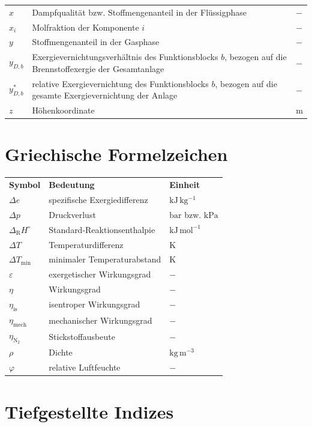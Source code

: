 \begin{longtable}{p{3cm}p{8cm}p{3cm}}
$x$ & Dampfqualität bzw. Stoffmengenanteil in der Flüssigphase & $-$ \\
$x_i$ & Molfraktion der Komponente $i$ & $-$ \\
$y$ & Stoffmengenanteil in der Gasphase & $-$ \\
$y_{D,b}$ & Exergievernichtungsverhältnis des Funktionsblocks $b$, bezogen auf die Brennstoffexergie der Gesamtanlage & $-$ \\
$y^*_{D,b}$ & relative Exergievernichtung des Funktionsblocks $b$, bezogen auf die gesamte Exergievernichtung der Anlage & $-$ \\
$z$ & Höhenkoordinate & $\mathrm{m}$ \\
\end{longtable}

\section*{Griechische Formelzeichen}

\begin{longtable}{p{3cm}p{8cm}p{3cm}}
\textbf{Symbol} & \textbf{Bedeutung} & \textbf{Einheit} \\
\addlinespace[0.5em]
$\Delta e$ & spezifische Exergiedifferenz & $\mathrm{kJ\,kg^{-1}}$ \\
$\Delta p$ & Druckverlust & $\mathrm{bar}$ bzw. $\mathrm{kPa}$ \\
$\Delta_\mathrm{R} H^\circ$ & Standard-Reaktionsenthalpie & $\mathrm{kJ\,mol^{-1}}$ \\
$\Delta T$ & Temperaturdifferenz & $\mathrm{K}$ \\
$\Delta T_{\min}$ & minimaler Temperaturabstand & $\mathrm{K}$ \\
$\varepsilon$ & exergetischer Wirkungsgrad & $-$ \\
$\eta$ & Wirkungsgrad & $-$ \\
$\eta_\mathrm{is}$ & isentroper Wirkungsgrad & $-$ \\
$\eta_\mathrm{mech}$ & mechanischer Wirkungsgrad & $-$ \\
$\eta_{\mathrm{N_2}}$ & Stickstoffausbeute & $-$ \\
$\rho$ & Dichte & $\mathrm{kg\,m^{-3}}$ \\
$\varphi$ & relative Luftfeuchte & $-$ \\
\end{longtable}

\section*{Tiefgestellte Indizes}


